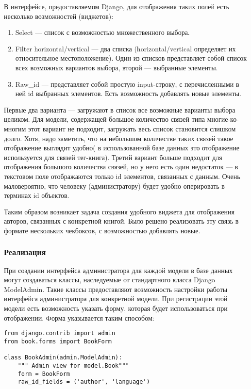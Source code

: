 В интерфейсе, предоставляемом Django, для отображения таких полей есть несколько возможностей (виджетов):
\begin{enumerate}
	\item Select --- список с возможностью множественного выбора.
	\item Filter horizontal/vertical --- два списка (horizontal/vertical определяет их относительное местоположение). Один из списков представляет собой список всех возможных вариантов выбора, второй --- выбранные элементы.
	\item Raw\_id --- представляет собой простую input-строку, с перечисленными в ней id выбранных элементов. Есть возможность добавлять новые элементы.
\end{enumerate}
Первые два варианта --- загружают в список все возможные варианты выбора целиком. Для модели, содержащей большое количество связей типа многие-ко-многим этот вариант не подходит, \tk загружать весь список становится слишком долго. Хотя, надо заметить, что на небольшом количестве таких связей такое отображение выглядит удобно( в использованной базе данных это отображение используется для связей тег-книга). 
Третий вариант больше подходит для отображения большого количества связей, но у него есть один недостаток --- в текстовом поле отображаются только id элементов, связанных с данным. Очень маловероятно, что человеку (администратору) будет удобно оперировать в терминах id объектов.

Таким образом возникает задача создания удобного виджета для отображения авторов, связанных с конкретной книгой.
Было решено реализовать эту связь в формате нескольких чекбоксов, с возможностью добавлять
новые.

\subsubsection{Реализация}

При создании интерфейса администратора для каждой модели в базе данных могут создаваться классы, наследуемые от стандартного класса Django ModelAdmin. Такие классы предоставляют возможность настройки работы интерфейса администратора для конкретной модели. При регистрации этой модели есть возможность указать форму, которая будет использоваться при отображении. Форма указывается таким способом:

{
\small \begin{verbatim}
from django.contrib import admin
from book.forms import BookForm

class BookAdmin(admin.ModelAdmin):
    """ Admin view for model.Book"""
    form = BookForm
    raw_id_fields = ('author', 'language')
\end{verbatim}
}

